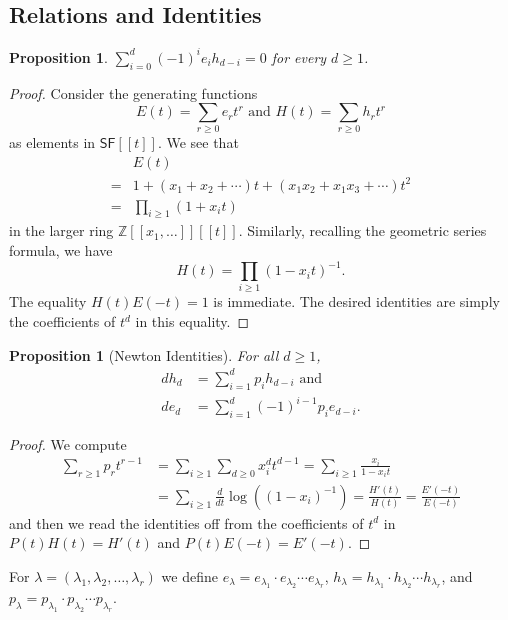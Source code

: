 \documentclass[12pt]{article}
\theoremstyle{plain}
\newtheorem{proposition}[theorem]{Proposition}
\theoremstyle{definition}
\theoremstyle{remark}
\numberwithin{equation}{section}
\begin{document}
\subsection{Relations and Identities}

\begin{proposition} \label{prop:fund_rel}
$\displaystyle\sum_{i=0}^d (-1)^i e_i h_{d-i}=0$ for every $d \ge 1$.
\end{proposition}

\begin{proof}
Consider the generating functions
\[ E(t) = \sum_{r \ge 0} e_r t^r
\textrm{ and }
H(t) = \sum_{r \ge 0} h_r t^r \]
as elements in $\mathsf{SF}[[t]]$.
We see that
\begin{align*}
& E(t)\\
 =& 1 + (x_1+x_2+\cdots)t
+ (x_1x_2+x_1x_3+\cdots)t^2 \\
=&\prod_{i \ge 1} (1+x_i t)
\end{align*}
in the larger ring $\mathbb{Z}[[x_1,\ldots]][[t]]$.
Similarly, recalling the geometric series formula, we have
\[
H(t) = \prod_{i \ge 1} (1-x_i t)^{-1} .
\]
The equality $H(t)E(-t)=1$ is immediate.
The desired identities are simply the coefficients of $t^d$
in this equality.
\end{proof}

\begin{proposition}[Newton Identities] For all $d \ge 1$,
\begin{align*}
dh_d&=\sum_{i=1}^d p_i h_{d-i} \textrm{ and} \\ 
de_d&=\sum_{i=1}^d (-1)^{i-1} p_i e_{d-i}.
\end{align*}
\end{proposition}

\begin{proof}
We compute
\begin{align*}
\sum_{r \ge 1} p_r t^{r-1}
&= \sum_{i \ge 1} \sum_{d \ge 0} x_i^d t^{d-1}
= \sum_{i \ge 1} \frac{x_i}{1-x_it}\\
&= \sum_{i \ge 1} \frac{d}{dt}\log\left(
\left(1-x_i\right)^{-1}\right)
= \frac{H'(t)}{H(t)} = \frac{E'(-t)}{E(-t)}
\end{align*}
and then we read the identities off from 
the coefficients of $t^d$ in $P(t)H(t)=H'(t)$
and $P(t)E(-t)=E'(-t)$.
\end{proof}

For $\lambda=(\lambda_1,\lambda_2,\ldots,\lambda_r)$ we define
$e_\lambda = e_{\lambda_1}\cdot e_{\lambda_2} \cdots e_{\lambda_r}$,
$h_\lambda = h_{\lambda_1}\cdot h_{\lambda_2} \cdots h_{\lambda_r}$, and
$p_\lambda = p_{\lambda_1}\cdot p_{\lambda_2} \cdots p_{\lambda_r}$.
\end{document}
